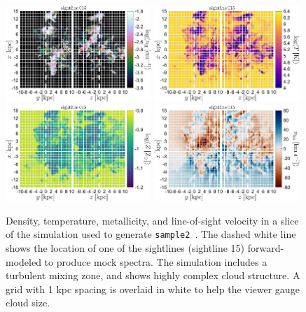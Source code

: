 \documentclass[fleqn,usenatbib]{mnras}
\begin{document}
\begin{figure}
    \centering
    \includegraphics[width=0.49\textwidth]{figures/sample2/projections/density_projection_maps_SL_15.jpg}
    \includegraphics[width=0.49\textwidth]{figures/sample2/projections/temperature_projection_maps_SL_15.jpg} \\
    \includegraphics[width=0.49\textwidth]{figures/sample2/projections/metallicity_projection_maps_SL_15.jpg}
    \includegraphics[width=0.49\textwidth]{figures/sample2/projections/velocity_projection_maps_SL_15.jpg}
    \caption{
    Density, temperature, metallicity, and line-of-sight velocity in a slice of the simulation used to generate \texttt{sample2}~\citep{mandelker2020Instability}.
    The dashed white line shows the location of one of the sightlines (sightline 15) forward-modeled to produce mock spectra.
    The simulation includes a turbulent mixing zone, and shows highly complex cloud structure.
    A grid with 1 kpc spacing is overlaid in white to help the viewer gauge cloud size.
    }
    \label{f: sample2 ray 15}
\end{figure}
\end{document}
